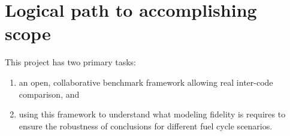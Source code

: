 \section{Logical path to accomplishing scope}

This project has two primary tasks:
\begin{enumerate}
\item an open, collaborative benchmark framework allowing real inter-code comparison, and
\item using this framework to understand what modeling fidelity is requires to
  ensure the robustness of conclusions for different fuel cycle scenarios.
\end{enumerate}





